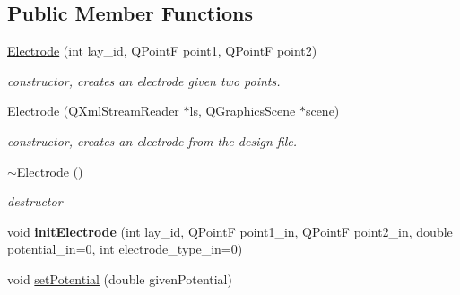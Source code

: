 \subsection*{Public Member Functions}
\begin{DoxyCompactItemize}
\item 
\hyperlink{classprim_1_1Electrode_a40012efb5f084bd3badafbcd50cb51c2}{Electrode} (int lay\+\_\+id, Q\+PointF point1, Q\+PointF point2)\hypertarget{classprim_1_1Electrode_a40012efb5f084bd3badafbcd50cb51c2}{}\label{classprim_1_1Electrode_a40012efb5f084bd3badafbcd50cb51c2}

\begin{DoxyCompactList}\small\item\em constructor, creates an electrode given two points. \end{DoxyCompactList}\item 
\hyperlink{classprim_1_1Electrode_a85d5f70eb1a37b0170e3518343cc4d64}{Electrode} (Q\+Xml\+Stream\+Reader $\ast$ls, Q\+Graphics\+Scene $\ast$scene)\hypertarget{classprim_1_1Electrode_a85d5f70eb1a37b0170e3518343cc4d64}{}\label{classprim_1_1Electrode_a85d5f70eb1a37b0170e3518343cc4d64}

\begin{DoxyCompactList}\small\item\em constructor, creates an electrode from the design file. \end{DoxyCompactList}\item 
\hyperlink{classprim_1_1Electrode_a919a606690a1e381258d140c5f48015b}{$\sim$\+Electrode} ()\hypertarget{classprim_1_1Electrode_a919a606690a1e381258d140c5f48015b}{}\label{classprim_1_1Electrode_a919a606690a1e381258d140c5f48015b}

\begin{DoxyCompactList}\small\item\em destructor \end{DoxyCompactList}\item 
void {\bfseries init\+Electrode} (int lay\+\_\+id, Q\+PointF point1\+\_\+in, Q\+PointF point2\+\_\+in, double potential\+\_\+in=0, int electrode\+\_\+type\+\_\+in=0)\hypertarget{classprim_1_1Electrode_a15cdfde52ab38084a346e9191355cf49}{}\label{classprim_1_1Electrode_a15cdfde52ab38084a346e9191355cf49}

\item 
void \hyperlink{classprim_1_1Electrode_af5632f8ee7b20a9c82c2ffecad27cd7f}{set\+Potential} (double given\+Potential)\hypertarget{classprim_1_1Electrode_af5632f8ee7b20a9c82c2ffecad27cd7f}{}\label{classprim_1_1Electrode_af5632f8ee7b20a9c82c2ffecad27cd7f}


\end{DoxyCompactItemize}

